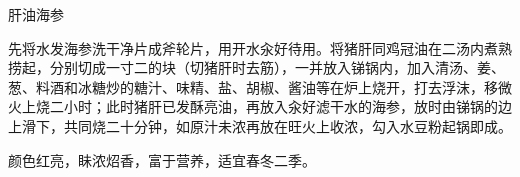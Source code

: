 \begin{recipe}{肝油海参}

\ingredients



\cooking

\step 先将水发海参洗干净片成斧轮片，用开水汆好待用。将猪肝同鸡冠油在二汤内煮熟捞起，分别切成一寸二的块（切猪肝时去筋），一并放入锑锅内，加入清汤、姜、葱、料酒和冰糖炒的糖汁、味精、盐、胡椒、酱油等在炉上烧开，打去浮沫，移微火上烧二小时；此时猪肝已发酥亮油，再放入汆好滤干水的海参，放时由锑锅的边上滑下，共同烧二十分钟，如原汁未浓再放在旺火上收浓，勾入水豆粉起锅即成。

\notes

颜色红亮，眛浓炤香，富于营养，适宜春冬二季。

\end{recipe}

